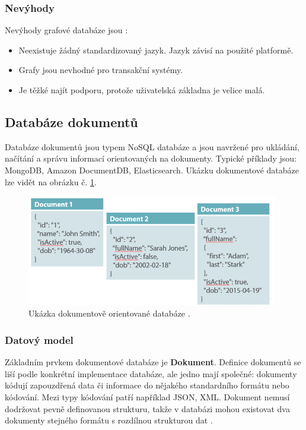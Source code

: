 \subsubsection{Nevýhody}
Nevýhody grafové databáze jsou \cite{advantages_graph}:
\begin{itemize}
\item Neexistuje žádný standardizovaný jazyk. Jazyk závisí na použité platformě.
\item Grafy jsou nevhodné pro transakční systémy.
\item Je těžké najít podporu, protože uživatelská základna je velice malá.
\end{itemize}
\newpage
\subsection{Databáze dokumentů}
Databáze dokumentů jsou typem NoSQL databáze a  jsou navržené pro ukládání, načítání a správu informací orientovaných na dokumenty. Typické příklady jsou: MongoDB, Amazon DocumentDB, Elasticsearch. Ukázku dokumentové databáze lze vidět na obrázku č. \ref{fig:db_img_document}.
	\begin{figure}[H]
	\centering
	\includegraphics[width=11cm]{img/databaze/document_db}
	\caption{Ukázka dokumentově orientované databáze \cite{relat_vs_nosql}.}
	\label{fig:db_img_document}
	\end{figure}
\subsubsection{Datový model}
Základním prvkem dokumentové databáze je \textbf{Dokument}. Definice dokumentů se liší podle konkrétní implementace databáze, ale jedno mají společné: dokumenty kódují zapouzdřená data či informace do nějakého standardního formátu nebo kódování. Mezi typy kódování patří například \gls{JSON}, \gls{XML}. Dokument nemusí dodržovat pevně definovanou strukturu, takže v databázi mohou existovat dva dokumenty stejného formátu s rozdílnou strukturou dat \cite{nosqlDatabaseBook, data_model_document}.

